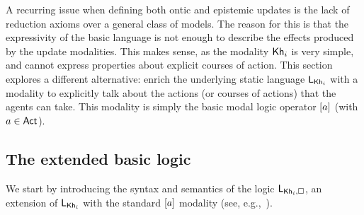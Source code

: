 A recurring issue when defining both ontic and epistemic updates is the lack of reduction axioms over a general class of models. The reason for this is that the expressivity of the basic language is not enough to describe the effects produced by the update modalities. This makes sense, as the modality ${\sf Kh}_i$ is very simple, and cannot express properties about explicit courses of action. 
%
%
%
This section explores a different alternative: enrich the underlying static language $\mathsf{L}_{{\sf Kh}_i}$ with a modality to explicitly talk about the actions (or courses of actions) that the agents can take. This modality is simply the basic modal logic operator $[a]$ (with $a\in{\rm \sf Act}$). 

\subsection{The extended basic logic}

We start by introducing the syntax and semantics of the logic $\mathsf{L}_{{\sf Kh}_i,\square}$,  an extension of $\mathsf{L}_{{\sf Kh}_i}$ with the standard $[a]$ modality (see, e.g.,~\cite{HML,mlbook}).

